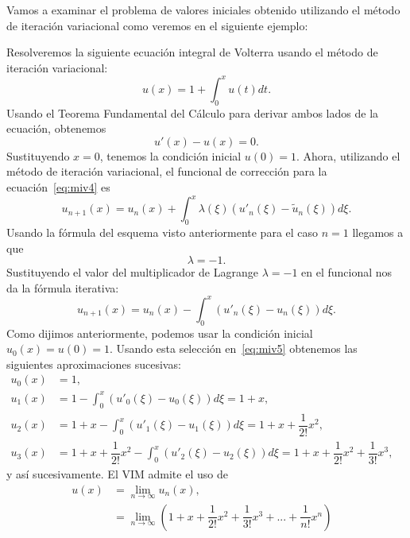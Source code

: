 Vamos a examinar el problema de valores iniciales obtenido utilizando el método de iteración variacional como veremos en el siguiente ejemplo:
\begin{ejemplo}
	Resolveremos la siguiente ecuación integral de Volterra usando el método de iteración variacional:
	\begin{equation}
		u(x) = 1 + \int_{0}^{x}u(t)dt.
	\end{equation}
	Usando el Teorema Fundamental del Cálculo para derivar ambos lados de la ecuación, obtenemos
	\begin{equation}\label{eq:miv4}
		u'(x) - u(x) = 0.
	\end{equation}
	Sustituyendo $x = 0$, tenemos la condición inicial $u(0) = 1.$ Ahora, utilizando el método de iteración variacional, el funcional de corrección para la ecuación~\eqref{eq:miv4} es
	\begin{equation}\label{eq:miv5}
		u_{n+1}(x) = u_n(x) + \int_{0}^{x} \lambda (\xi) (u'_n(\xi) - \tilde{u}_n(\xi))d\xi.
	\end{equation}
	Usando la fórmula del esquema visto anteriormente para el caso $n = 1$ llegamos a que 
	\begin{equation}
		\lambda = -1.
	\end{equation}
	Sustituyendo el valor del multiplicador de Lagrange $\lambda = -1$ en el funcional nos da la fórmula iterativa:
	\begin{equation}
		u_{n+1}(x) = u_n(x) - \int_{0}^{x} (u'_n(\xi) - u_n(\xi))d\xi.
	\end{equation}
	Como dijimos anteriormente, podemos usar la condición inicial $u_0(x) = u(0) = 1.$ Usando esta selección en~\eqref{eq:miv5} obtenemos las siguientes aproximaciones sucesivas:
	\begin{align}
		u_0(x) &= 1,      &   \\
		u_1(x) &= 1 - \int_{0}^{x} (u'_0(\xi) - u_0(\xi))d\xi = 1 + x,    & \\
		u_2(x) &= 1 + x - \int_{0}^{x} (u'_1(\xi) - u_1(\xi))d\xi = 1 + x + \dfrac{1}{2!}x^2,    & \\
		u_3(x) &= 1 + x + \dfrac{1}{2!}x^2 - \int_{0}^{x} (u'_2(\xi) - u_2(\xi))d\xi = 1 + x + \dfrac{1}{2!}x^2 + \dfrac{1}{3!}x^3,    &
	\end{align}
	y así sucesivamente. El VIM admite el uso de 
	\begin{align}
		u(x) &= \lim_{n \rightarrow \infty} u_n(x),      &   \\
		&= \lim_{n \rightarrow \infty} (1 + x + \dfrac{1}{2!}x^2 + \dfrac{1}{3!}x^3 + ... + \dfrac{1}{n!}x^n)

\end{align}
\end{ejemplo}
